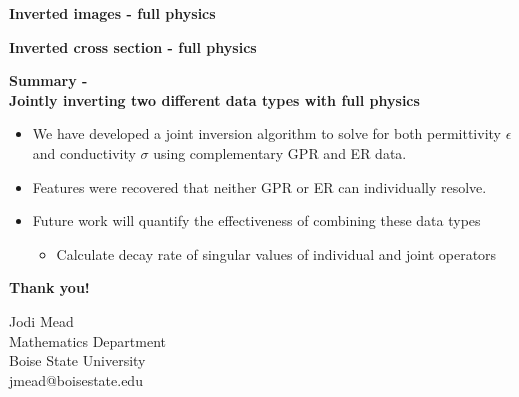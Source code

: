\documentclass[
paper=A6,landscape,
fontsize=11pt, %
pagesize, %
parskip=half-, %
]{scrartcl} %
\theoremstyle{mythmstyle} %
\begin{document}
\vspace*{.2in}
\centerline{}
\clearpage

{\large \bf Inverted images - full physics }

\centerline{}


\clearpage
{\large \bf Inverted cross section - full physics}

\vspace*{.2in}
\centerline{}
\clearpage


{\large \bf Summary - \\ Jointly inverting two different data types with full physics}
\begin{itemize}
\item We have developed a joint inversion algorithm to solve for
both permittivity $\epsilon$ and conductivity $\sigma$   using complementary GPR and ER data.
\item Features were recovered that neither GPR or ER can individually resolve.
\item Future work will quantify the effectiveness of combining these data types 
\begin{itemize}
\item Calculate decay rate of singular values of individual and joint operators
\end{itemize}
\end{itemize}
\clearpage




{\large \bf Thank you!}
\vspace*{1.in}
\begin{flushright} Jodi Mead\\Mathematics Department\\ Boise State University\\ jmead@boisestate.edu \end{flushright}

\clearpage
\end{document}
